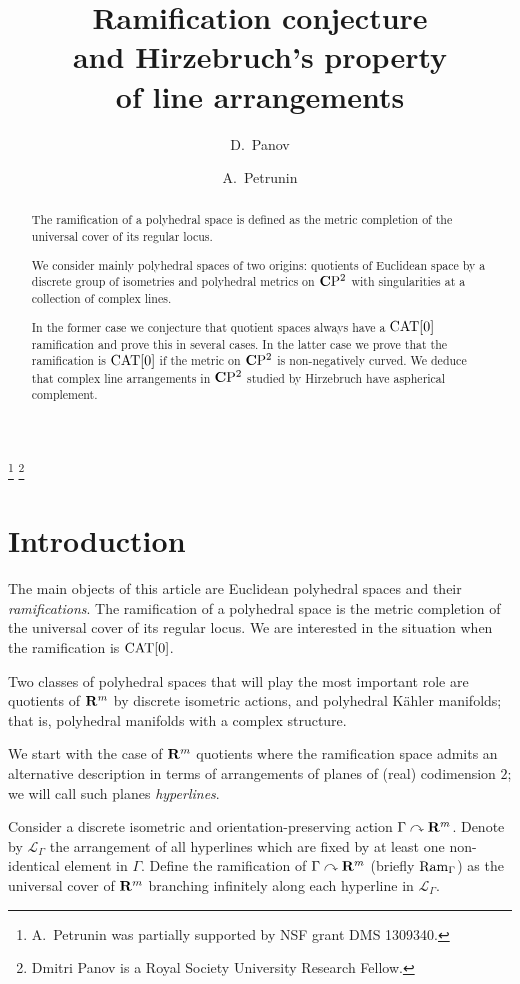 \documentclass{compositio}
\begin{document}
\title{Ramification conjecture\\ 
and Hirzebruch's property\\ of line arrangements}
\author{D.~Panov}
\author{A.~Petrunin}
\date{}
\thanks{A.~Petrunin was partially supported by NSF grant DMS 1309340.}
\thanks{Dmitri Panov is a Royal Society University Research Fellow.}
\begin{abstract}
The ramification of a polyhedral space is defined as the metric completion of the universal cover of its regular locus.

We consider mainly 
polyhedral spaces of two origins: quotients of Euclidean space by a discrete group of isometries and polyhedral metrics on $\mathbf{C}\mathrm{P}^2$ with singularities at a collection of complex lines. 

In the former case we conjecture that quotient spaces always have a $\mathrm{CAT}[0]$ ramification and prove this in several cases.  In the latter case  we prove that the ramification is $\mathrm{CAT}[0]$ if the metric on $\mathbf{C}\mathrm{P}^2$ is non-negatively curved. We deduce that complex line arrangements in $\mathbf{C}\mathrm{P}^2$ studied by Hirzebruch have aspherical complement.
\end{abstract}
\maketitle


\section{Introduction}

The main objects of this article are Euclidean polyhedral spaces and their \emph {ramifications}. The ramification  of a polyhedral space is the metric completion of the universal cover of its regular locus. We are interested in the situation when the ramification is $\mathrm{CAT}[0]$. 

Two classes of polyhedral spaces that will play the most important role are quotients of $\mathbf{R}^m$ by discrete isometric actions, and polyhedral K\"ahler manifolds; 
that is, polyhedral manifolds with a complex structure. 

We start with the case of $\mathbf{R}^m$ quotients where the ramification space admits an alternative description in terms of  arrangements of planes of (real) codimension $2$;
we will call such planes \emph{hyperlines}.

Consider a discrete isometric and orientation-preserving action $\Gamma\curvearrowright\mathbf{R}^m$.
Denote by $\mathcal{L}_\Gamma$ the arrangement of all hyperlines which are fixed by at least one non-identical element in $\Gamma$. Define the ramification of $\Gamma\curvearrowright\mathbf{R}^m$
(briefly $\mathop{\rm Ram}\nolimits_\Gamma$)
as the universal cover of $\mathbf{R}^m$  branching infinitely  along each hyperline in $\mathcal{L}_\Gamma$.
\end{document}
